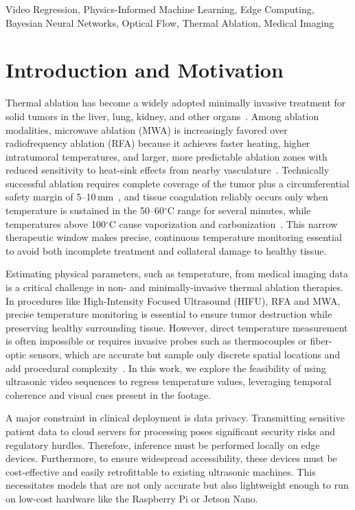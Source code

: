 \documentclass[conference]{IEEEtran}
\begin{document}
\begin{IEEEkeywords}
Video Regression, Physics-Informed Machine Learning, Edge Computing, Bayesian Neural Networks, Optical Flow, Thermal Ablation, Medical Imaging
\end{IEEEkeywords}

\section{Introduction and Motivation}
Thermal ablation has become a widely adopted minimally invasive treatment for solid tumors in the liver, lung, kidney, and other organs~\cite{Vogl2017,Ahmed2014}. Among ablation modalities, microwave ablation (MWA) is increasingly favored over radiofrequency ablation (RFA) because it achieves faster heating, higher intratumoral temperatures, and larger, more predictable ablation zones with reduced sensitivity to heat-sink effects from nearby vasculature~\cite{Lubner2010,Shibata2000}. Technically successful ablation requires complete coverage of the tumor plus a circumferential safety margin of 5--10\,mm~\cite{Ahmed2014}, and tissue coagulation reliably occurs only when temperature is sustained in the 50--60$^\circ$C range for several minutes, while temperatures above 100$^\circ$C cause vaporization and carbonization~\cite{Vogl2017}. This narrow therapeutic window makes precise, continuous temperature monitoring essential to avoid both incomplete treatment and collateral damage to healthy tissue.

Estimating physical parameters, such as temperature, from medical imaging data is a critical challenge in non- and minimally-invasive thermal ablation therapies.
In procedures like High-Intensity Focused Ultrasound (HIFU), RFA and MWA, precise temperature monitoring is essential to ensure tumor destruction while preserving healthy surrounding tissue. However, direct temperature measurement is often impossible or requires invasive probes such as thermocouples or fiber-optic sensors, which are accurate but sample only discrete spatial locations and add procedural complexity~\cite{Geoghegan2022}. In this work, we explore the feasibility of using ultrasonic video sequences to regress temperature values, leveraging temporal coherence and visual cues present in the footage.

A major constraint in clinical deployment is data privacy. Transmitting sensitive patient data to cloud servers for processing poses significant security risks and regulatory hurdles. Therefore, inference must be performed locally on edge devices. Furthermore, to ensure widespread accessibility, these devices must be cost-effective and easily retrofittable to existing ultrasonic machines. This necessitates models that are not only accurate but also lightweight enough to run on low-cost hardware like the Raspberry Pi or Jetson Nano.
\end{document}
